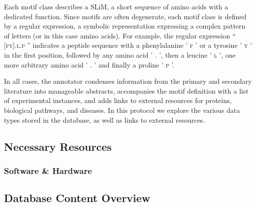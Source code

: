 \documentclass[12pt]{article}
\newcounter{proto}
\newcommand\motif[1]{%
    \textsc{\lowercase{#1}}%
}
\begin{document}
Each motif class describes a SLiM, a short sequence of amino acids with a
dedicated function. Since motifs are often degenerate, each motif class is
defined by a regular expression, a symbolic representation expressing a complex
pattern of letters (or in this case amino acids). For example, the regular
expression ``\motif{[FY].L.P}'' indicates a peptide sequence with a
phenylalanine '\motif{F}' or a tyrosine '\motif{Y}' in the first position,
followed by any amino acid '\motif{.}', then a leucine '\motif{L}', one more
arbitrary amino acid '\motif{.}' and finally a proline '\motif{P}'.

In all cases, the annotator condenses information from the primary and secondary
literature into manageable abstracts, accompanies the motif definition with a
list of experimental instances, and adds links to external resources for
proteins, biological pathways, and diseases. In this protocol we explore the
various data types stored in the database, as well as links to external
resources.

%
%
\subsection*{Necessary Resources}
\subsubsection*{Software \& Hardware}



%
%
\subsection*{Database Content Overview}%
\label{subsec:explore_content_database}%
\end{document}
